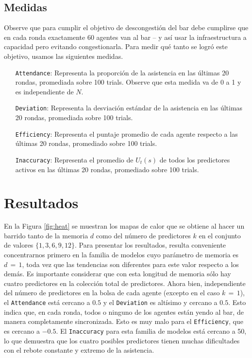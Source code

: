 \documentclass[11pt]{amsart}
\begin{document}
\subsection{Medidas}
Observe que para cumplir el objetivo de descongestión del bar debe cumplirse que en cada ronda exactamente 60 agentes van al bar -- y así usar la infraestructura a capacidad pero evitando congestionarla. Para medir qué tanto se logró este objetivo, usamos las siguientes medidas. 

\begin{itemize}
\item[\texttt{Attendance}:] Representa la proporción de la asistencia en las últimas 20 rondas, promediada sobre 100 trials. Observe que esta medida va de 0 a 1 y es independiente de $N$.
\item[\texttt{Deviation}:] Representa la desviación estándar de la asistencia en las últimas 20 rondas, promediada sobre 100 trials.
\item[\texttt{Efficiency}:] Representa el puntaje promedio de cada agente respecto a las últimas 20 rondas, promediado sobre 100 trials.
\item[\texttt{Inaccuracy}:] Representa el promedio de $U_t(s)$ de todos los predictores activos en las últimas 20 rondas, promediado sobre 100 trials.
\end{itemize}

\section{Resultados}\label{sec:resul}
En la Figura \ref{fig:heat} se muestran los mapas de calor que se obtiene al hacer un barrido tanto de la memoria $d$ como del número de predictores $k$ en el conjunto de valores $\{1,3,6,9,12\}$. Para presentar los resultados, resulta conveniente concentrarnos primero en la familia de modelos cuyo parámetro de memoria es $d\,{=}\,1$, toda vez que las tendencias son diferentes para este valor respecto a los demás. Es importante considerar que con esta longitud de memoria sólo hay cuatro predictores en la colección total de predictores. Ahora bien, independiente del número de predictores en la bolsa de cada agente (excepto en el caso $k\,{=}\,1$), el \texttt{Attendance} está cercano a $0.5$ y el \texttt{Deviation} es altísimo y cercano a $0.5$. Esto indica que, en cada ronda, todos o ninguno de los agentes están yendo al bar, de manera completamente sincronizada. Esto es muy malo para el \texttt{Efficiency},  que es cercano a $-0.5$. El \texttt{Inaccuracy} para esta familia de modelos está cercano a 50, lo que demuestra que los cuatro posibles predictores tienen muchas dificultades con el rebote constante y extremo de la asistencia.
\end{document}
